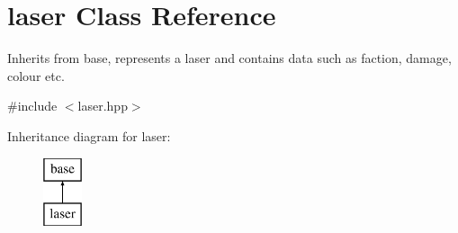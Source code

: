 \hypertarget{classlaser}{\section{laser Class Reference}
\label{classlaser}
}


Inherits from base, represents a laser and contains data such as faction, damage, colour etc.  




{\ttfamily \#include $<$laser.\-hpp$>$}

Inheritance diagram for laser\-:\begin{figure}[H]
\begin{center}
\leavevmode
\includegraphics[height=2.000000cm]{classlaser}
\end{center}
\end{figure}

